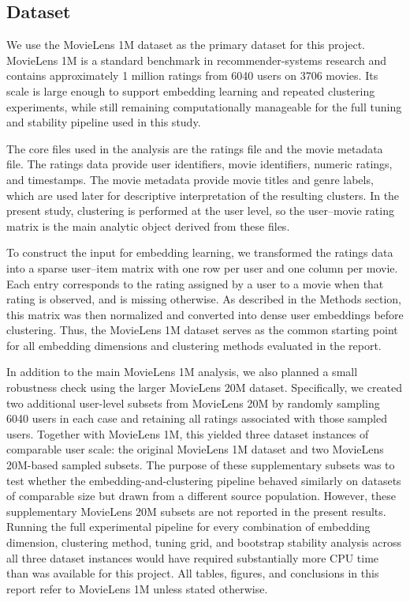 \documentclass[
  11pt,
  letterpaper,
  DIV=11,
  numbers=noendperiod]{scrartcl}
\begin{document}
\subsection{Dataset}\label{sec-dataset}

We use the MovieLens 1M dataset as the primary dataset for this project.
MovieLens 1M is a standard benchmark in recommender-systems research and
contains approximately 1 million ratings from 6040 users on 3706 movies.
Its scale is large enough to support embedding learning and repeated
clustering experiments, while still remaining computationally manageable
for the full tuning and stability pipeline used in this study.

The core files used in the analysis are the ratings file and the movie
metadata file. The ratings data provide user identifiers, movie
identifiers, numeric ratings, and timestamps. The movie metadata provide
movie titles and genre labels, which are used later for descriptive
interpretation of the resulting clusters. In the present study,
clustering is performed at the user level, so the user--movie rating
matrix is the main analytic object derived from these files.

To construct the input for embedding learning, we transformed the
ratings data into a sparse user--item matrix with one row per user and
one column per movie. Each entry corresponds to the rating assigned by a
user to a movie when that rating is observed, and is missing otherwise.
As described in the Methods section, this matrix was then normalized and
converted into dense user embeddings before clustering. Thus, the
MovieLens 1M dataset serves as the common starting point for all
embedding dimensions and clustering methods evaluated in the report.

In addition to the main MovieLens 1M analysis, we also planned a small
robustness check using the larger MovieLens 20M dataset. Specifically,
we created two additional user-level subsets from MovieLens 20M by
randomly sampling 6040 users in each case and retaining all ratings
associated with those sampled users. Together with MovieLens 1M, this
yielded three dataset instances of comparable user scale: the original
MovieLens 1M dataset and two MovieLens 20M-based sampled subsets. The
purpose of these supplementary subsets was to test whether the
embedding-and-clustering pipeline behaved similarly on datasets of
comparable size but drawn from a different source population. However,
these supplementary MovieLens 20M subsets are not reported in the
present results. Running the full experimental pipeline for every
combination of embedding dimension, clustering method, tuning grid, and
bootstrap stability analysis across all three dataset instances would
have required substantially more CPU time than was available for this
project. All tables, figures, and conclusions in this report refer to
MovieLens 1M unless stated otherwise.
\end{document}

